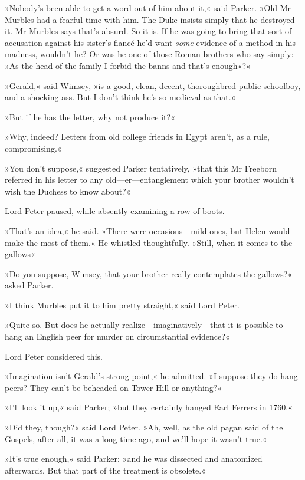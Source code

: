 »Nobody's been able to get a word out of him about it,« said Parker. »Old Mr Murbles had a fearful time with him. The Duke insists simply that he destroyed it. Mr Murbles says that's absurd. So it is. If he was going to bring that sort of accusation against his sister's fiancé he'd want \textit{some} evidence of a method in his madness, wouldn't he? Or was he one of those Roman brothers who say simply: »As the head of the family I forbid the banns and that's enough«?«

»Gerald,« said Wimsey, »is a good, clean, decent, thoroughbred public schoolboy, and a shocking ass. But I don't think he's so medieval as that.«

»But if he has the letter, why not produce it?«

»Why, indeed? Letters from old college friends in Egypt aren't, as a rule, compromising.«

»You don't suppose,« suggested Parker tentatively, »that this Mr Freeborn referred in his letter to any old\allowbreak---\allowbreak er\allowbreak---\allowbreak entanglement which your brother wouldn't wish the Duchess to know about?«

Lord Peter paused, while absently examining a row of boots.

»That's an idea,« he said. »There were occasions\allowbreak---\allowbreak mild ones, but Helen would make the most of them.« He whistled thoughtfully. »Still, when it comes to the gallows\longdash«

»Do you suppose, Wimsey, that your brother really contemplates the gallows?« asked Parker.

»I think Murbles put it to him pretty straight,« said Lord Peter.

»Quite so. But does he actually realize\allowbreak---\allowbreak imaginatively---that it is possible to hang an English peer for murder on circumstantial evidence?«

Lord Peter considered this.

»Imagination isn't Gerald's strong point,« he admitted. »I suppose they do hang peers? They can't be beheaded on Tower Hill or anything?«

»I'll look it up,« said Parker; »but they certainly hanged Earl Ferrers in 1760.«

»Did they, though?« said Lord Peter. »Ah, well, as the old pagan said of the Gospels, after all, it was a long time ago, and we'll hope it wasn't true.«

»It's true enough,« said Parker; »and he was dissected and anatomized afterwards. But that part of the treatment is obsolete.«

